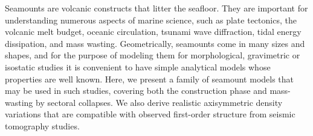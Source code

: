 Seamounts are volcanic constructs that litter the seafloor.
They are important for understanding numerous aspects of marine science, such as
plate tectonics, the volcanic melt budget, oceanic circulation, tsunami wave diffraction,
tidal energy dissipation, and mass wasting. Geometrically, seamounts come in many sizes and shapes,
and for the purpose of modeling them for morphological, gravimetric or isostatic studies
it is convenient to have simple analytical models whose properties are well known.  Here,
we present a family of seamount models that may be used in such studies, covering both the
construction phase and mass-wasting by sectoral collapses. We also derive
realistic axisymmetric density variations that are compatible with observed first-order structure
from seismic tomography studies.
